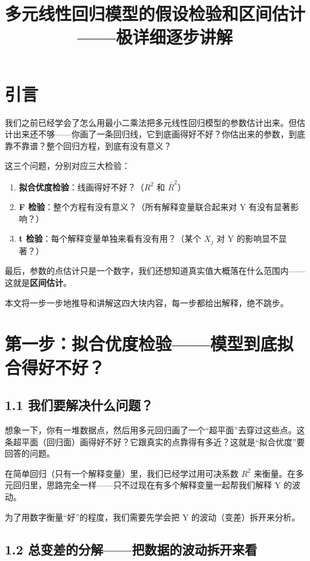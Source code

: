 \documentclass[12pt,a4paper]{ctexart}
\title{\bfseries 多元线性回归模型的假设检验和区间估计——极详细逐步讲解}
\author{}
\date{}
\begin{document}
\maketitle

\section{引言}

我们之前已经学会了怎么用最小二乘法把多元线性回归模型的参数估计出来。但估计出来还不够——你画了一条回归线，它到底画得好不好？你估出来的参数，到底靠不靠谱？整个回归方程，到底有没有意义？

这三个问题，分别对应三大检验：
\begin{enumerate}
    \item \textbf{拟合优度检验}：线画得好不好？（\(R^2\) 和 \(\bar{R}^2\)）
    \item \textbf{F 检验}：整个方程有没有意义？（所有解释变量联合起来对 Y 有没有显著影响？）
    \item \textbf{t 检验}：每个解释变量单独来看有没有用？（某个 \(X_j\) 对 Y 的影响显不显著？）
\end{enumerate}
最后，参数的点估计只是一个数字，我们还想知道真实值大概落在什么范围内——这就是\textbf{区间估计}。

本文将一步一步地推导和讲解这四大块内容，每一步都给出解释，绝不跳步。

\section{第一步：拟合优度检验——模型到底拟合得好不好？}

\subsection{1.1 我们要解决什么问题？}

想象一下，你有一堆数据点，然后用多元回归画了一个“超平面”去穿过这些点。这条超平面（回归面）画得好不好？它跟真实的点靠得有多近？这就是“拟合优度”要回答的问题。

在简单回归（只有一个解释变量）里，我们已经学过用可决系数 \(R^2\) 来衡量。在多元回归里，思路完全一样——只不过现在有多个解释变量一起帮我们解释 Y 的波动。

为了用数字衡量“好”的程度，我们需要先学会把 Y 的波动（变差）拆开来分析。

\subsection{1.2 总变差的分解——把数据的波动拆开来看}
\end{document}
